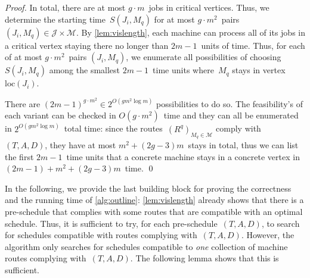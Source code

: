 \documentclass[natbib,sort,smallextended,envcountsame,envcountsect,numbook]{svjour3}
\newcommand{\bigO}{O}
\newcommand{\loc}{\text{loc}}
\newcommand{\Js}{\mathcal J}
\newcommand{\Ms}{\mathcal M}
\newcommand{\nmach}{m}
\newcommand{\nverts}{g}
\def\totstays{\ensuremath{{m^2+(2g-3)m}}}
\begin{document}
\begin{proof}
  In total, there are at most \(\nverts\cdot\nmach\)~jobs in critical vertices.
  Thus, we determine the starting time~\(S(J_i,M_q)\)
  for at most \(\nverts\cdot\nmach^2\)~pairs \((J_i,M_q)\in\Js\times\Ms\).
  By \cref{lem:vislength},
  each machine can process all of its jobs in a critical vertex staying there
  no longer than \(2\nmach-1\)~units of time.
  Thus, for each of at most \(\nverts\cdot\nmach^2\)~pairs \((J_i,M_q)\),
  we enumerate all possibilities of choosing \(S(J_i,M_q)\) among the
  smallest \(2\nmach-1\)~time units where~\(M_q\) stays in vertex~\(\loc(J_i)\).

  There are \((2\nmach-1)^{\nverts\cdot\nmach^2}\in 2^{\bigO(\nverts\nmach^2\log\nmach)}\)
  possibilities to do so.  The feasibility's of each variant
  can be checked in \(O(g\cdot m^2)\)~time and
  they can all be enumerated in \(2^{\bigO(\nverts\nmach^2\log\nmach)}\)~total time:
  since the routes~\((R^q)_{M_q\in\Ms}\) comply with~\((T,A,D)\),
  they
  have at most \(\totstays\)~stays in total,
  thus we can list the first \(2m-1\)~time units
  that a concrete machine stays in a concrete vertex
  in \((2m-1)+\totstays\)~time.
\qed\end{proof}

\noindent
In the following, we provide the last building block
for proving the correctness and the running time of \cref{alg:outline}:
\cref{lem:vislength} already shows that there is a pre-schedule
that complies with some routes that are compatible with
an optimal schedule.
Thus, it is sufficient to try, for each pre-schedule~\((T,A,D)\),
to search for schedules compatible with routes
complying with~\((T,A,D)\).
However, the algorithm only searches for schedules
compatible to \emph{one} collection of machine routes
complying with~\((T,A,D)\).
The following lemma shows that this is sufficient.
\end{document}
